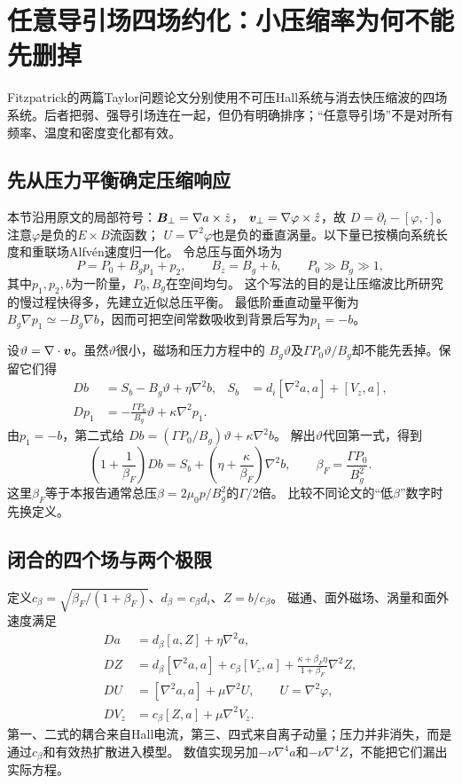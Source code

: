 \documentclass[UTF8,a4paper,11pt,openany,fontset=fandol]{ctexbook}
\begin{document}
\section{任意导引场四场约化：小压缩率为何不能先删掉}
Fitzpatrick的两篇Taylor问题论文分别使用不可压Hall系统与消去快压缩波的四场系统。后者把弱、强导引场连在一起，但仍有明确排序；“任意导引场”不是对所有频率、温度和密度变化都有效。\citep{L057,L058}

\subsection{先从压力平衡确定压缩响应}
本节沿用原文的局部符号：$\bm{B}_\perp=\nabla a\times\hat z$，
$\bm{v}_\perp=\nabla\varphi\times\hat z$，故
$D=\partial_t-[\varphi,\cdot]$。注意$\varphi$是负的$E\times B$流函数；
$U=\nabla^2\varphi$也是负的垂直涡量。以下量已按横向系统长度和重联场Alfvén速度归一化。
令总压与面外场为
\begin{equation}
 P=P_0+B_g p_1+p_2,\qquad B_z=B_g+b,
 \qquad P_0\gg B_g\gg1,
\end{equation}
其中$p_1,p_2,b$为一阶量，$P_0,B_g$在空间均匀。
这个写法的目的是让压缩波比所研究的慢过程快得多，先建立近似总压平衡。
最低阶垂直动量平衡为
$B_g\nabla p_1\simeq-B_g\nabla b$，因而可把空间常数吸收到背景后写为$p_1=-b$。

设$\vartheta=\nabla\cdot\bm{v}$。虽然$\vartheta$很小，磁场和压力方程中的
$B_g\vartheta$及$\Gamma P_0\vartheta/B_g$却不能先丢掉。保留它们得
\begin{align}
 Db&=S_b-B_g\vartheta+\eta\nabla^2b,
 &S_b&=d_i[\nabla^2a,a]+[V_z,a],\\
 Dp_1&=-\frac{\Gamma P_0}{B_g}\vartheta+\kappa\nabla^2p_1.
\end{align}
由$p_1=-b$，第二式给
$Db=(\Gamma P_0/B_g)\vartheta+\kappa\nabla^2b$。
解出$\vartheta$代回第一式，得到
\begin{equation}
 \left(1+\frac1{\beta_F}\right)Db
 =S_b+\left(\eta+\frac{\kappa}{\beta_F}\right)\nabla^2b,
 \qquad \beta_F=\frac{\Gamma P_0}{B_g^2}.
\end{equation}
这里$\beta_F$等于本报告通常总压$\beta=2\mu_0p/B_g^2$的$\Gamma/2$倍。
比较不同论文的“低$\beta$”数字时先换定义。

\subsection{闭合的四个场与两个极限}
定义$c_\beta=\sqrt{\beta_F/(1+\beta_F)}$、$d_\beta=c_\beta d_i$、$Z=b/c_\beta$。
磁通、面外磁场、涡量和面外速度满足
\begin{align}
 Da&=d_\beta[a,Z]+\eta\nabla^2a,\\
 DZ&=d_\beta[\nabla^2a,a]+c_\beta[V_z,a]
       +\frac{\kappa+\beta_F\eta}{1+\beta_F}\nabla^2Z,\\
 DU&=[\nabla^2a,a]+\mu\nabla^2U,\qquad U=\nabla^2\varphi,\\
 DV_z&=c_\beta[Z,a]+\mu\nabla^2V_z.
 \label{eq:fitzfour}
\end{align}
第一、二式的耦合来自Hall电流，第三、四式来自离子动量；压力并非消失，而是通过$c_\beta$和有效热扩散进入模型。
数值实现另加$-\nu\nabla^4a$和$-\nu\nabla^4Z$，不能把它们漏出实际方程。
\end{document}
